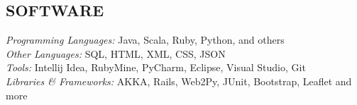 \documentclass[margin]{res}
\begin{document}
\begin{resume}
\section{SOFTWARE} 
  {\sl Programming Languages:} Java, Scala, Ruby, Python, and others \\
  {\sl Other Languages:} SQL, HTML, XML, CSS, JSON \\ 
  {\sl Tools:} Intellij Idea, RubyMine, PyCharm, Eclipse, Visual Studio, Git \\
  {\sl Libraries \& Frameworks:} AKKA, Rails, Web2Py, JUnit, Bootstrap, Leaflet and more 
            
\end{resume}
\end{document}

